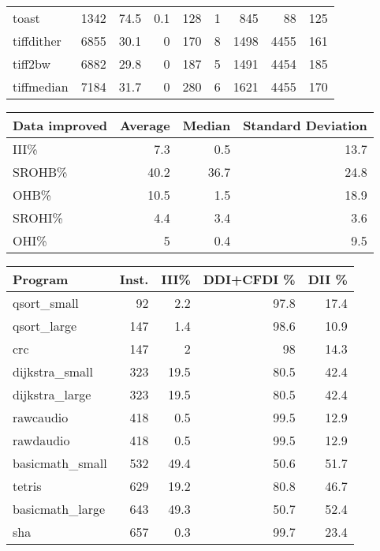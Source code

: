 \begin{tabular}{lrrrrrrrr}
 toast           &     1342 &     74.5 &    0.1 &  128 &    1 &    845 &    88 &   125 \\
 tiffdither      &     6855 &     30.1 &    0   &  170 &    8 &   1498 &  4455 &   161 \\
 tiff2bw         &     6882 &     29.8 &    0   &  187 &    5 &   1491 &  4454 &   185 \\
 tiffmedian      &     7184 &     31.7 &    0   &  280 &    6 &   1621 &  4455 &   170 \\
\hline
\end{tabular}\begin{tabular}{lrrr}
\hline
 Data improved   &   Average &   Median &   Standard Deviation \\
\hline
 III\%            &       7.3 &      0.5 &                 13.7 \\
 SROHB\%          &      40.2 &     36.7 &                 24.8 \\
 OHB\%            &      10.5 &      1.5 &                 18.9 \\
 SROHI\%          &       4.4 &      3.4 &                  3.6 \\
 OHI\%            &       5   &      0.4 &                  9.5 \\
\hline
\end{tabular}\begin{tabular}{lrrrr}
\hline
 Program         &   Inst. &   III\% &   DDI+CFDI \% &   DII \% \\
\hline
 qsort\_small     &      92 &    2.2 &         97.8 &    17.4 \\
 qsort\_large     &     147 &    1.4 &         98.6 &    10.9 \\
 crc             &     147 &    2   &         98   &    14.3 \\
 dijkstra\_small  &     323 &   19.5 &         80.5 &    42.4 \\
 dijkstra\_large  &     323 &   19.5 &         80.5 &    42.4 \\
 rawcaudio       &     418 &    0.5 &         99.5 &    12.9 \\
 rawdaudio       &     418 &    0.5 &         99.5 &    12.9 \\
 basicmath\_small &     532 &   49.4 &         50.6 &    51.7 \\
 tetris          &     629 &   19.2 &         80.8 &    46.7 \\
 basicmath\_large &     643 &   49.3 &         50.7 &    52.4 \\
 sha             &     657 &    0.3 &         99.7 &    23.4 \\

\end{tabular}
